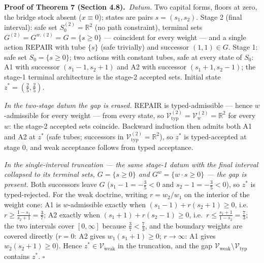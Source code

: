 \documentclass[review,11pt]{elsarticle}
\begin{document}
\textbf{Proof of Theorem 7 (Section 4.8).}\ \emph{Datum.} Two capital forms, floors at zero, the bridge stock absent
(\(x \equiv 0\)); states are pairs \(s = (s_1, s_2)\). Stage 2 (final
interval): safe set \(S_0^{(2)} = \mathbb{R}^2\) (no path constraint),
terminal sets \(G^{(2)} = G^{w,(2)} = G = \{ s \ge 0 \}\) --- coincident
for every weight --- and a single action REPAIR with tube \(\{s\}\)
(safe trivially) and successor \((1, 1) \in G\). Stage 1: safe set
\(S_0 = \{ s \ge 0 \}\); two actions with constant tubes, safe at every
state of \(S_0\): A1 with successor \((s_1 - 1, s_2 + 1)\) and A2 with
successor \((s_1 + 1, s_2 - 1)\); the stage-1 terminal architecture is
the stage-2 accepted sets. Initial state \(z^* = (\tfrac25, \tfrac25)\).

\emph{In the two-stage datum the gap is erased.} REPAIR is
typed-admissible --- hence \(w\)-admissible for every weight --- from
every state, so
\(\mathcal{V}_{\mathrm{typ}}^{(2)} = \mathcal{V}_w^{(2)} = \mathbb{R}^2\)
for every \(w\): the stage-2 accepted sets coincide. Backward induction
then admits both A1 and A2 at \(z^*\) (safe tubes; successors in
\(\mathcal{V}_{\mathrm{typ}}^{(2)} = \mathbb{R}^2\)), so \(z^*\) is
typed-accepted at stage 0, and weak acceptance follows from typed
acceptance.

\emph{In the single-interval truncation --- the same stage-1 datum with
the final interval collapsed to its terminal sets, \(G = \{s \ge 0\}\)
and \(G^w = \{w \cdot s \ge 0\}\) --- the gap is present.} Both
successors leave \(G\) (\(s_1 - 1 = -\tfrac35 < 0\) and
\(s_2 - 1 = -\tfrac35 < 0\)), so \(z^*\) is typed-rejected. For the weak
doctrine, writing \(r = w_2 / w_1\) on the interior of the weight cone:
A1 is \(w\)-admissible exactly when \((s_1 - 1) + r (s_2 + 1) \ge 0\),
i.e.~\(r \ge \tfrac{1 - s_1}{s_2 + 1} = \tfrac37\); A2 exactly when
\((s_1 + 1) + r (s_2 - 1) \ge 0\),
i.e.~\(r \le \tfrac{s_1 + 1}{1 - s_2} = \tfrac73\); the two intervals
cover \([0, \infty]\) because \(\tfrac37 < \tfrac73\), and the boundary
weights are covered directly (\(r = 0\): A2 gives
\(w_1(s_1 + 1) \ge 0\); \(r \to \infty\): A1 gives
\(w_2(s_2 + 1) \ge 0\)). Hence \(z^* \in \mathcal{V}_{\mathrm{weak}}\)
in the truncation, and the gap
\(\mathcal{V}_{\mathrm{weak}} \setminus \mathcal{V}_{\mathrm{typ}}\)
contains \(z^*\). \ensuremath{\square}
\end{document}
